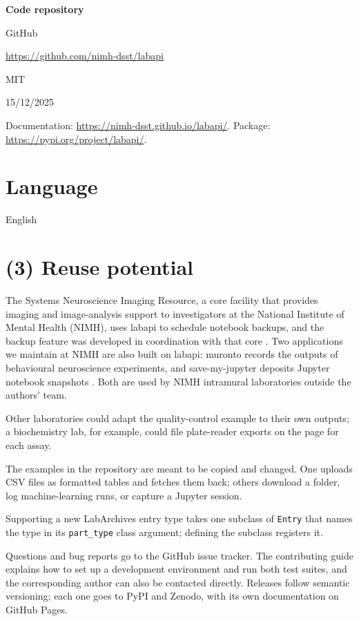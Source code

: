 \documentclass{jors}
\begin{document}
{\bf Code repository}

\begin{description}[noitemsep,topsep=0pt]
	\item[Name:] GitHub
	\item[Identifier:] \url{https://github.com/nimh-dsst/labapi}
	\item[Licence:] MIT
	\item[Date published:] 15/12/2025
\end{description}

Documentation: \url{https://nimh-dsst.github.io/labapi/}. Package:
\url{https://pypi.org/project/labapi/}.

\section*{Language}

English

\section*{(3) Reuse potential}

The Systems Neuroscience Imaging Resource, a core facility that provides
imaging and image-analysis support to investigators at the National
Institute of Mental Health (NIMH), uses labapi to schedule notebook
backups, and the backup feature was developed in coordination with that
core \citep{labapi_issue_264}. Two applications we
maintain at NIMH are also built on labapi: muronto records the outputs of
behavioural neuroscience experiments, and save-my-jupyter deposits Jupyter
notebook snapshots \citep{muronto,save_my_jupyter}. Both are used by NIMH
intramural laboratories outside the authors' team.

Other laboratories could adapt the quality-control example to their own
outputs; a biochemistry lab, for example, could file plate-reader exports
on the page for each assay.

The examples in the repository are meant to be copied and changed. One
uploads CSV files as formatted tables and fetches them back; others
download a folder, log machine-learning runs, or capture a Jupyter session.

Supporting a new LabArchives entry type takes one subclass of
\texttt{Entry} that names the type in its \texttt{part\_type} class
argument; defining the subclass registers it.

Questions and bug reports go to the GitHub issue tracker. The contributing
guide explains how to set up a development environment and run both test
suites, and the corresponding author can also be contacted directly.
Releases follow semantic versioning; each one goes to PyPI and Zenodo,
with its own documentation on GitHub Pages.
\end{document}
